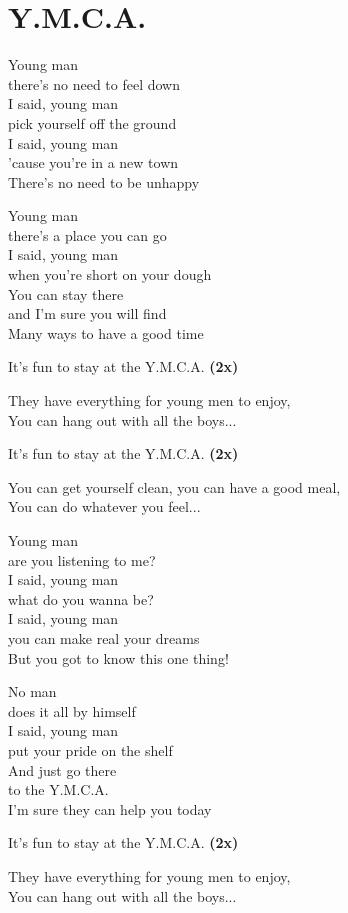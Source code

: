 \section{Y.M.C.A.}
Young man\\
there's no need to feel down\\
I said, young man\\
pick yourself off the ground\\
I said, young man\\
'cause you're in a new town\\
There's no need to be unhappy

Young man\\
there's a place you can go\\
I said, young man\\
when you're short on your dough\\
You can stay there\\
and I'm sure you will find\\
Many ways to have a good time

It's fun to stay at the Y.M.C.A. \textbf{(2x)}

They have everything for young men to enjoy,\\
You can hang out with all the boys...

It's fun to stay at the Y.M.C.A. \textbf{(2x)}

You can get yourself clean, you can have a good meal,\\
You can do whatever you feel...

Young man\\
are you listening to me?\\
I said, young man\\
what do you wanna be?\\
I said, young man\\
you can make real your dreams\\
But you got to know this one thing!

No man\\
does it all by himself\\
I said, young man\\
put your pride on the shelf\\
And just go there\\
to the Y.M.C.A.\\
I'm sure they can help you today

It's fun to stay at the Y.M.C.A. \textbf{(2x)}

They have everything for young men to enjoy,\\
You can hang out with all the boys...

